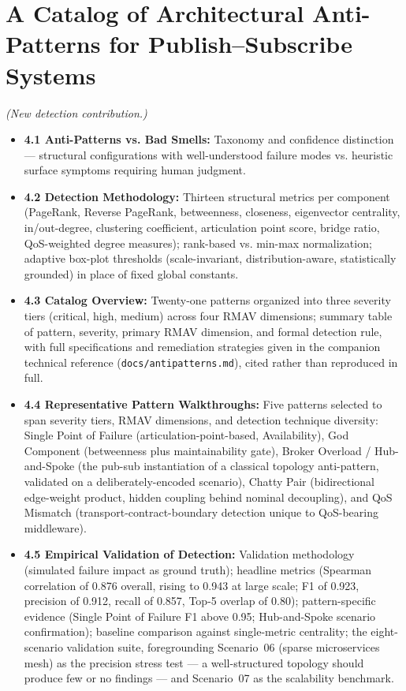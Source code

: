 \documentclass[11pt]{article}
\begin{document}
\section{A Catalog of Architectural Anti-Patterns for Publish--Subscribe Systems}

\emph{(New detection contribution.)}

\begin{itemize}[leftmargin=*]
\item \textbf{4.1 Anti-Patterns vs. Bad Smells:} Taxonomy and confidence distinction --- structural
  configurations with well-understood failure modes vs. heuristic surface symptoms requiring human
  judgment.
\item \textbf{4.2 Detection Methodology:} Thirteen structural metrics per component (PageRank,
  Reverse PageRank, betweenness, closeness, eigenvector centrality, in/out-degree, clustering
  coefficient, articulation point score, bridge ratio, QoS-weighted degree measures); rank-based vs.
  min-max normalization; adaptive box-plot thresholds (scale-invariant, distribution-aware,
  statistically grounded) in place of fixed global constants.
\item \textbf{4.3 Catalog Overview:} Twenty-one patterns organized into three severity tiers
  (critical, high, medium) across four RMAV dimensions; summary table of pattern, severity, primary
  RMAV dimension, and formal detection rule, with full specifications and remediation strategies
  given in the companion technical reference (\texttt{docs/antipatterns.md}), cited rather than
  reproduced in full.
\item \textbf{4.4 Representative Pattern Walkthroughs:} Five patterns selected to span severity
  tiers, RMAV dimensions, and detection technique diversity: Single Point of Failure
  (articulation-point-based, Availability), God Component (betweenness plus maintainability gate),
  Broker Overload / Hub-and-Spoke (the pub-sub instantiation of a classical topology anti-pattern,
  validated on a deliberately-encoded scenario), Chatty Pair (bidirectional edge-weight product,
  hidden coupling behind nominal decoupling), and QoS Mismatch (transport-contract-boundary detection
  unique to QoS-bearing middleware).
\item \textbf{4.5 Empirical Validation of Detection:} Validation methodology (simulated failure
  impact as ground truth); headline metrics (Spearman correlation of 0.876 overall, rising to 0.943 at
  large scale; F1 of 0.923, precision of 0.912, recall of 0.857, Top-5 overlap of 0.80);
  pattern-specific evidence (Single Point of Failure F1 above 0.95; Hub-and-Spoke scenario
  confirmation); baseline comparison against single-metric centrality; the eight-scenario validation
  suite, foregrounding Scenario~06 (sparse microservices mesh) as the precision stress test --- a
  well-structured topology should produce few or no findings --- and Scenario~07 as the scalability
  benchmark.
\end{itemize}
\end{document}
